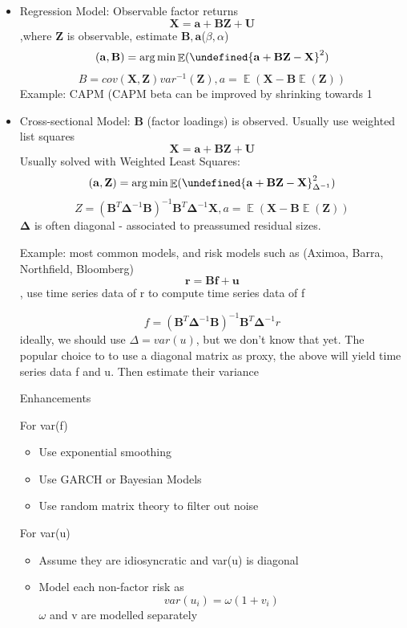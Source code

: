 \documentclass[11pt, openany]{book}              %
\let\norm\undefined %
\DeclarePairedDelimiter\norm{\lVert}{\rVert}
\DeclareMathOperator*{\argmin}{arg\,min}  %
\DeclareMathOperator{\E}{\mathbb{E}}
\begin{document}
\begin{itemize}
	\item Regression Model: Observable factor returns
	$$ \mathbf{X} =  \mathbf{a} +  \mathbf{BZ} +  \mathbf{U}$$ ,where $\mathbf{Z}$ is observable, estimate $\mathbf{B, a}$($\beta, \alpha$)
	$$(\mathbf{a,B}) = \argmin \E( \norm{\mathbf{a} + \mathbf{BZ} - \mathbf{X}}^2)$$
	$$ B = cov(\mathbf{X,Z}) var^{-1} (\mathbf{Z}), a = \E(\mathbf{X} - \mathbf{B}\E(\mathbf{Z}))$$
	Example: CAPM (CAPM beta can be improved by shrinking towards 1
	\item Cross-sectional Model: $\mathbf{B}$ (factor loadings) is observed. Usually use weighted list squares
	$$ \mathbf{X} =  \mathbf{a} +  \mathbf{BZ} +  \mathbf{U}$$ 
	Usually solved with Weighted Least Squares:
	$$(\mathbf{a,Z}) = \argmin \E( \norm{\mathbf{a} + \mathbf{BZ} - \mathbf{X}}^2_{\Delta^{-1}})$$
	$$ Z = (\mathbf{B}^T \mathbf{\Delta}^{-1} \mathbf{B})^{-1} \mathbf{B}^T \mathbf{\Delta}^{-1} \mathbf{X}, a = \E(\mathbf{X} - \mathbf{B}\E(\mathbf{Z}))$$
	$\mathbf{\Delta}$ is often diagonal - associated to preassumed residual sizes.
	
	\subitem Example: most common models, and risk models such as (Aximoa, Barra, Northfield, Bloomberg) $$\mathbf{r} = \mathbf{Bf} + \mathbf{u}$$, use time series data of r to compute time series data of f
	
		$$f = (\mathbf{B}^T \mathbf{\Delta}^{-1} \mathbf{B})^{-1} \mathbf{B}^T \mathbf{\Delta}^{-1} r$$
		ideally, we should use $\Delta=var(u)$, but we don't know that yet. The popular choice to to use a diagonal matrix as proxy, the above will yield time series data f and u. Then estimate their variance
		
		\subitem Enhancements
		
		For var(f)
		\begin{itemize}
			\item Use exponential smoothing
			\item Use GARCH or Bayesian Models
			\item Use random matrix theory to filter out noise
		\end{itemize}
		
		For var(u)
		\begin{itemize}
			\item Assume they are idiosyncratic and var(u) is diagonal
			\item Model each non-factor risk as
				$$var(u_i) = \omega(1 + v_i)$$ $\omega$ and v are modelled separately
		\end{itemize}
	

\end{itemize}
\end{document}
